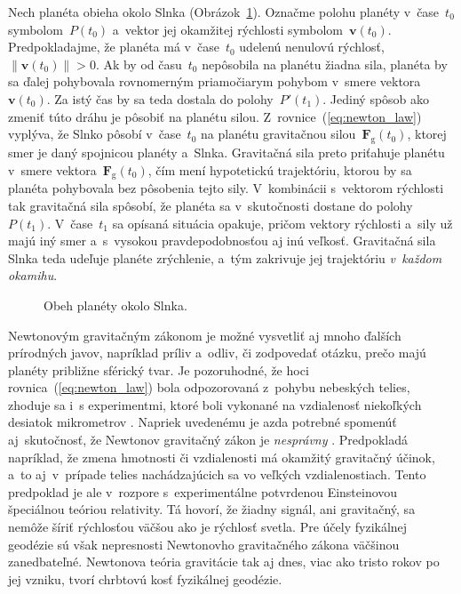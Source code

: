 \documentclass[a4paper, 12pt]{book}
\newcommand{\gidx}{\mathrm g}
\let\vec\mathbf
\begin{document}
Nech planéta obieha okolo Slnka (Obrázok~\ref{fig:orbital_motion}).  Označme 
polohu planéty v~čase~$t_0$ symbolom~$P(t_0)$ a~vektor jej okamžitej rýchlosti 
symbolom~$\vec v(t_0)$.  Predpokladajme, že planéta má v~čase~$t_0$ udelenú 
nenulovú rýchlosť, $\| \vec v(t_0) \| > 0$.  Ak by od času~$t_0$ nepôsobila na 
planétu žiadna sila, planéta by sa ďalej pohybovala rovnomerným priamočiarym 
pohybom v~smere vektora~$\vec v(t_0)$.  Za istý čas by sa teda dostala do 
polohy~$P'(t_1)$.  Jediný spôsob ako zmeniť túto dráhu je pôsobiť na planétu 
silou.  Z~rovnice~(\ref{eq:newton_law}) vyplýva, že Slnko pôsobí v~čase~$t_0$ 
na planétu gravitačnou silou~$\vec F_\gidx(t_0)$, ktorej smer je daný spojnicou 
planéty a~Slnka.  Gravitačná sila preto priťahuje planétu v~smere vektora~$\vec 
F_\gidx(t_0)$, čím mení hypotetickú trajektóriu, ktorou by sa planéta 
pohybovala bez pôsobenia tejto sily.  V~kombinácii s~vektorom rýchlosti tak 
gravitačná sila spôsobí, že planéta sa v~skutočnosti dostane do 
polohy~$P(t_1)$.  V~čase~$t_1$ sa opísaná situácia opakuje, pričom vektory 
rýchlosti a~sily už majú iný smer a~s~vysokou pravdepodobnosťou aj inú veľkosť.  
Gravitačná sila Slnka teda udeľuje planéte zrýchlenie, a~tým zakrivuje jej 
trajektóriu \emph{v~každom okamihu}.

\begin{figure}
\centering

\caption{Obeh planéty okolo Slnka.}
\label{fig:orbital_motion}
\end{figure}

Newtonovým gravitačným zákonom je možné vysvetliť aj mnoho ďalších prírodných 
javov, napríklad príliv a~odliv, či zodpovedať otázku, prečo majú planéty 
približne sférický tvar.  Je pozoruhodné, že hoci rovnica~(\ref{eq:newton_law}) 
bola odpozorovaná z~pohybu nebeských telies, zhoduje sa i~s experimentmi, ktoré 
boli vykonané na vzdialenosť niekoľkých desiatok mikrometrov 
\parencite{Lee2020}.  Napriek uvedenému je azda potrebné spomenúť 
aj~skutočnosť, že Newtonov gravitačný zákon je \emph{nesprávny} 
\parencite{Feynman}.  Predpokladá napríklad, že zmena hmotnosti či vzdialenosti 
má okamžitý gravitačný účinok, a~to aj~v~prípade telies nachádzajúcich sa vo 
veľkých vzdialenostiach.  Tento predpoklad je ale v~rozpore s~experimentálne 
potvrdenou Einsteinovou špeciálnou teóriou relativity.  Tá hovorí, že žiadny 
signál, ani gravitačný, sa nemôže šíriť rýchlosťou väčšou ako je rýchlosť 
svetla.  Pre účely fyzikálnej geodézie sú však nepresnosti Newtonovho 
gravitačného zákona väčšinou zanedbateľné.  Newtonova teória gravitácie tak aj 
dnes, viac ako tristo rokov po jej vzniku, tvorí chrbtovú kosť fyzikálnej 
geodézie.
\end{document}
